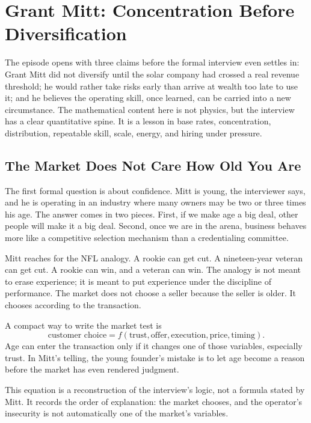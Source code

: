 \chapter{Grant Mitt: Concentration Before Diversification}

The episode opens with three claims before the formal interview even settles in: Grant Mitt did not diversify until the solar company had crossed a real revenue threshold; he would rather take risks early than arrive at wealth too late to use it; and he believes the operating skill, once learned, can be carried into a new circumstance. The mathematical content here is not physics, but the interview has a clear quantitative spine. It is a lesson in base rates, concentration, distribution, repeatable skill, scale, energy, and hiring under pressure.

\section{The Market Does Not Care How Old You Are}

The first formal question is about confidence. Mitt is young, the interviewer says, and he is operating in an industry where many owners may be two or three times his age. The answer comes in two pieces. First, if we make age a big deal, other people will make it a big deal. Second, once we are in the arena, business behaves more like a competitive selection mechanism than a credentialing committee.

Mitt reaches for the NFL analogy. A rookie can get cut. A nineteen-year veteran can get cut. A rookie can win, and a veteran can win. The analogy is not meant to erase experience; it is meant to put experience under the discipline of performance. The market does not choose a seller because the seller is older. It chooses according to the transaction.

A compact way to write the market test is
\begin{equation}
\text{customer choice}
=
f(\text{trust},\text{offer},\text{execution},\text{price},\text{timing}).
\end{equation}
Age can enter the transaction only if it changes one of those variables, especially trust. In Mitt's telling, the young founder's mistake is to let age become a reason before the market has even rendered judgment.

\begin{remark}
This equation is a reconstruction of the interview's logic, not a formula stated by Mitt. It records the order of explanation: the market chooses, and the operator's insecurity is not automatically one of the market's variables.
\end{remark}


